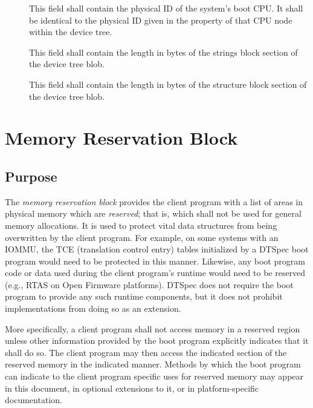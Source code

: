 \documentclass[a4paper,10pt,oneside]{sphinxmanual}
\begin{document}
\begin{description}
\item[{}] \leavevmode
This field shall contain the physical ID of the system’s boot CPU.
It shall be identical to the physical ID given in the  property
of that CPU node within the device tree.

\item[{}] \leavevmode
This field shall contain the length in bytes of the strings block
section of the device tree blob.

\item[{}] \leavevmode
This field shall contain the length in bytes of the structure block
section of the device tree blob.

\end{description}


\section{Memory Reservation Block}
\label{flattened-format:memory-reservation-block}\label{flattened-format:sect-fdt-memory-reservation-block}

\subsection{Purpose}
\label{flattened-format:purpose}
The \emph{memory reservation block} provides the client program with a list
of areas in physical memory which are \emph{reserved}; that is, which shall
not be used for general memory allocations. It is used to protect vital
data structures from being overwritten by the client program. For
example, on some systems with an IOMMU, the TCE (translation control
entry) tables initialized by a DTSpec boot program would need to be
protected in this manner. Likewise, any boot program code or data used
during the client program’s runtime would need to be reserved (e.g.,
RTAS on Open Firmware platforms). DTSpec does not require the boot
program to provide any such runtime components, but it does not prohibit
implementations from doing so as an extension.

More specifically, a client program shall not access memory in a
reserved region unless other information provided by the boot program
explicitly indicates that it shall do so. The client program may then
access the indicated section of the reserved memory in the indicated
manner. Methods by which the boot program can indicate to the client
program specific uses for reserved memory may appear in this document,
in optional extensions to it, or in platform-specific documentation.
\end{document}
